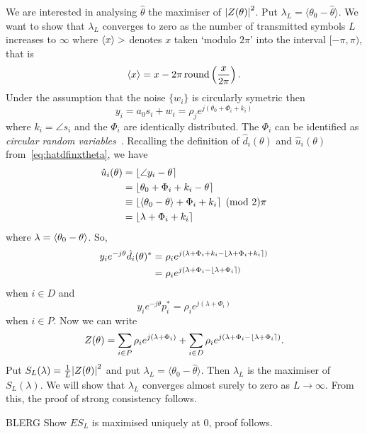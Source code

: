 \documentclass[a4paper,10pt]{article}
\begin{document}
We are interested in analysing $\hat{\theta}$ the maximiser of ${\left| Z(\theta) \right|}^2$.  Put $\lambda_L = \langle\theta_0 - \hat{\theta}\rangle$.  We want to show that $\lambda_L$ converges to zero as the number of transmitted symbols $L$ increases to $\infty$ where $\langle x \rangle>$ denotes $x$ taken `modulo $2\pi$' into the interval $[-\pi, \pi)$, that is
\[
\left\langle x \right\rangle = x - 2\pi\operatorname{round}\left(\frac{x}{2\pi}\right).
\]
Under the assumption that the noise $\{w_i\}$ is circularly symetric then
\[
y_i = a_0 s_i + w_i = \rho_j e^{j ( \theta_0 + \Phi_i + k_i) }
\] 
where $k_i = \angle s_i$ and the $\Phi_i$ are identically distributed.  The $\Phi_i$ can be identified as \emph{circular random variables}~\cite{Mardia_directional_statistics,Fisher1993,McKilliam_mean_dir_est_sq_arc_length2010}.  Recalling the definition of $\hat{d}_i(\theta)$ and $\hat{u}_i(\theta)$ from~\eqref{eq:hatdfinxtheta}, we have
\begin{align*}
\hat{u}_i(\theta) &= {\left\lfloor \angle{y_i} - \theta \right\rceil} \\
&= {\left\lfloor \theta_0 + \Phi_i + k_i - \theta \right\rceil} \\
&\equiv {\left\lfloor  \left\langle \theta_0 - \theta \right\rangle + \Phi_i + k_i \right\rceil} \pmod 2\pi \\
&= {\left\lfloor  \lambda + \Phi_i + k_i  \right\rceil} \\
\end{align*}
where $\lambda = \left\langle \theta_0 - \theta \right\rangle$.  So,
\begin{align*}
 y_i e^{-j\theta} \hat{d}_i(\theta)^* &= \rho_i e^{j(\lambda + \Phi_i + k_i - {\left\lfloor \lambda + \Phi_i + k_i \right\rceil})} \\
&= \rho_i e^{j(\lambda + \Phi_i - {\left\lfloor \lambda + \Phi_i \right\rceil})}
\end{align*}
when $i \in D$ and
\[
y_i e^{-j\theta} p_i^* = \rho_i e^{j(\lambda + \Phi_i)}
\]
when $i \in P$.  Now we can write
\[
Z(\theta) = \sum_{i \in P} \rho_i e^{j(\lambda + \Phi_i)} + \sum_{i \in D}  \rho_i e^{j( \lambda + \Phi_i - {\left\lfloor \lambda + \Phi_i \right\rceil})}.
\]
Put $S_L(\lambda) = \frac{1}{L}{\left| Z(\theta) \right|}^2$ and put $\lambda_L = \langle\theta_0 - \hat{\theta}\rangle$.  Then $\lambda_L$ is the maximiser of $S_L(\lambda)$.  We will show that $\lambda_L$ converges almost surely to zero as $L \rightarrow \infty$.  From this, the proof of strong consistency follows.

BLERG  Show $E S_L$ is maximised uniquely at 0, proof follows.
\end{document}
